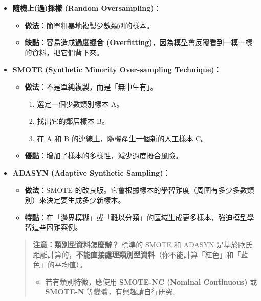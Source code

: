 \documentclass[
  letterpaper,
  DIV=11,
  numbers=noendperiod]{scrreprt}
\providecommand{\tightlist}{%
  \setlength{\itemsep}{0pt}\setlength{\parskip}{0pt}}
\begin{document}
\begin{itemize}
\tightlist
\item
  \textbf{隨機上(過)採樣 (Random Oversampling)}：

  \begin{itemize}
  \tightlist
  \item
    \textbf{做法}：簡單粗暴地複製少數類別的樣本。
  \item
    \textbf{缺點}：容易造成\textbf{過度擬合
    (Overfitting)}，因為模型會反覆看到一模一樣的資料，把它們背下來。
  \end{itemize}
\item
  \textbf{SMOTE (Synthetic Minority Over-sampling Technique)}：

  \begin{itemize}
  \tightlist
  \item
    \textbf{做法}：不是單純複製，而是「無中生有」。

    \begin{enumerate}
    \def\labelenumi{\arabic{enumi}.}
    \tightlist
    \item
      選定一個少數類別樣本 A。
    \item
      找出它的鄰居樣本 B。
    \item
      在 A 和 B 的連線上，隨機產生一個新的人工樣本 C。
    \end{enumerate}
  \item
    \textbf{優點}：增加了樣本的多樣性，減少過度擬合風險。
  \end{itemize}
\item
  \textbf{ADASYN (Adaptive Synthetic Sampling)}：

  \begin{itemize}
  \tightlist
  \item
    \textbf{做法}：SMOTE
    的改良版。它會根據樣本的學習難度（周圍有多少多數類別）來決定要生成多少新樣本。
  \item
    \textbf{特點}：在「邊界模糊」或「難以分類」的區域生成更多樣本，強迫模型學習這些困難案例。
  \end{itemize}

  \begin{quote}
  \textbf{注意：類別型資料怎麼辦？} 標準的 SMOTE 和 ADASYN
  是基於歐氏距離計算的，\textbf{不能直接處理類別型資料}（你不能計算「紅色」和「藍色」的平均值）。

  \begin{itemize}
  \tightlist
  \item
    若有類別特徵，應使用 \textbf{SMOTE-NC (Nominal Continuous)} 或
    \textbf{SMOTE-N} 等變體，有興趣請自行研究。
  \end{itemize}
  \end{quote}
\end{itemize}
\end{document}
